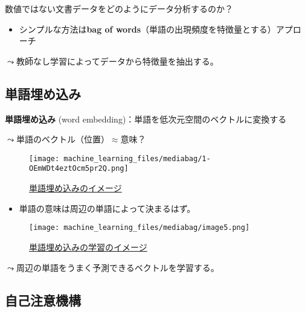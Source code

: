 \documentclass[
  xelatex,
  ja=standard]{bxjsarticle}
\providecommand{\tightlist}{%
  \setlength{\itemsep}{0pt}\setlength{\parskip}{0pt}}\usepackage{longtable,booktabs,array}
\begin{document}
数値ではない文書データをどのようにデータ分析するのか？

\begin{itemize}
\tightlist
\item
  シンプルな方法は\textbf{bag of
  words}（単語の出現頻度を特徴量とする）アプローチ
\end{itemize}

\(\leadsto\)教師なし学習によってデータから特徴量を抽出する。

\hypertarget{ux5358ux8a9eux57cbux3081ux8fbcux307f}{%
\subsection{単語埋め込み}\label{ux5358ux8a9eux57cbux3081ux8fbcux307f}}

\textbf{単語埋め込み} (word
embedding)：単語を低次元空間のベクトルに変換する

\(\leadsto\)単語のベクトル（位置）\(\approx\)意味？

\begin{figure}[htpb]

{\centering \texttt{[image: machine\_learning\_files/mediabag/1-OEmWDt4eztOcm5pr2Q.png]}

}

\caption{\href{https://towardsdatascience.com/creating-word-embeddings-coding-the-word2vec-algorithm-in-python-using-deep-learning-b337d0ba17a8}{単語埋め込みのイメージ}}

\end{figure}

\begin{itemize}
\tightlist
\item
  単語の意味は周辺の単語によって決まるはず。
\end{itemize}

\begin{figure}[htpb]

{\centering \texttt{[image: machine\_learning\_files/mediabag/image5.png]}

}

\caption{\href{https://ainow.ai/2021/04/08/254071/}{単語埋め込みの学習のイメージ}}

\end{figure}

\(\leadsto\)周辺の単語をうまく予測できるベクトルを学習する。

\hypertarget{ux81eaux5df1ux6ce8ux610fux6a5fux69cb}{%
\subsection{自己注意機構}\label{ux81eaux5df1ux6ce8ux610fux6a5fux69cb}}
\end{document}

